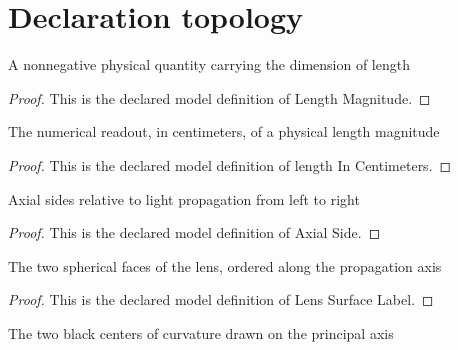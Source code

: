 \section{Declaration topology}
\begin{definition}
  \label{def:physics:phyx-mini-0064:phyxminiproblems-problemphyxmini0064-lengthmagnitude}
  A nonnegative physical quantity carrying the dimension of length
\end{definition}
\begin{proof}
  This is the declared model definition of Length Magnitude.
\end{proof}
\begin{definition}
  \label{def:physics:phyx-mini-0064:phyxminiproblems-problemphyxmini0064-lengthincentimeters}
  The numerical readout, in centimeters, of a physical length magnitude
\end{definition}
\begin{proof}
  This is the declared model definition of length In Centimeters.
\end{proof}
\begin{definition}
  \label{def:physics:phyx-mini-0064:phyxminiproblems-problemphyxmini0064-axialside}
  Axial sides relative to light propagation from left to right
\end{definition}
\begin{proof}
  This is the declared model definition of Axial Side.
\end{proof}
\begin{definition}
  \label{def:physics:phyx-mini-0064:phyxminiproblems-problemphyxmini0064-lenssurfacelabel}
  The two spherical faces of the lens, ordered along the propagation axis
\end{definition}
\begin{proof}
  This is the declared model definition of Lens Surface Label.
\end{proof}
\begin{definition}
  \label{def:physics:phyx-mini-0064:phyxminiproblems-problemphyxmini0064-centerofcurvaturedot}
  The two black centers of curvature drawn on the principal axis
\end{definition}
